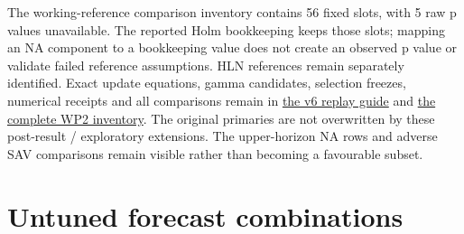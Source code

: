 \documentclass[11pt,a4paper]{article}
\begin{document}
The working-reference comparison inventory contains 56 fixed slots,
with 5 raw p values unavailable.
The reported Holm bookkeeping keeps those slots; mapping an NA component to a
bookkeeping value does not create an observed p value or validate failed
reference assumptions. HLN references remain separately identified.
Exact update equations, gamma candidates, selection freezes,
numerical receipts and all comparisons remain in
\href{https://github.com/ByronLi0207/financial-mathematics-paper-20261020/blob/revision-v7-final/protocol/revision-v6/REPLAY.md}{the v6 replay guide} and
\href{https://github.com/ByronLi0207/financial-mathematics-paper-20261020/blob/revision-v7-final/results/revision-20261023/v6/wp2-summary.json}{the complete WP2 inventory}.
The original primaries are not overwritten by these post-result / exploratory
extensions. The upper-horizon NA rows and adverse SAV comparisons remain
visible rather than becoming a favourable subset.\section{Untuned forecast combinations}\label{sup:wp3}
\end{document}
